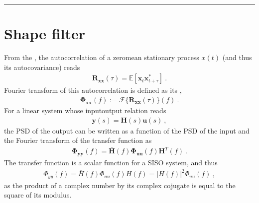 \documentclass[letterpaper,10pt,english]{jupyterBook}
\begin{document}
\bigskip\hrule\bigskip


\sphinxstepscope


\chapter{Shape filter}
\label{\detokenize{ch/system-theory/shape-filter:shape-filter}}\label{\detokenize{ch/system-theory/shape-filter:system-theory-shape-filter}}\label{\detokenize{ch/system-theory/shape-filter::doc}}
\sphinxAtStartPar
{}
From the {\hyperref[\detokenize{ch/system-theory/lti-response:ode-lti-response-stochastic}]{}}, the auto\sphinxhyphen{}correlation of a zero\sphinxhyphen{}mean stationary process \(x(t)\) (and thus its auto\sphinxhyphen{}covariance) reads
\begin{equation*}
\begin{split}\mathbf{R}_{\mathbf{x} \mathbf{x}}(\tau) = \mathbb{E}\left[ \mathbf{x}_t \mathbf{x}^*_{t + \tau} \right] \ .\end{split}
\end{equation*}
\sphinxAtStartPar
Fourier transform of this auto\sphinxhyphen{}correlation is defined as its ,
\begin{equation*}
\begin{split}\boldsymbol\Phi_{\mathbf{x} \mathbf{x}} (f) := \mathscr{F} \{ \mathbf{R}_{\mathbf{x} \mathbf{x}} (\tau) \} (f) \ .\end{split}
\end{equation*}
\sphinxAtStartPar
For a linear system whose input\sphinxhyphen{}output relation reads
\begin{equation*}
\begin{split}\mathbf{y}(s) = \mathbf{H}(s) \mathbf{u}(s) \ ,\end{split}
\end{equation*}
\sphinxAtStartPar
the PSD of the output can be written as a function of the PSD of the input and the Fourier transform of the transfer function as
\begin{equation}\label{equation:ch/system-theory/shape-filter:eq:psd:io:vector}
\begin{split}\boldsymbol\Phi_{\mathbf{y}\mathbf{y}} (f) = \overline{\mathbf{H}}(f) \boldsymbol\Phi_{\mathbf{u}\mathbf{u}}(f) \mathbf{H}^T(f) \ .\end{split}
\end{equation}
\sphinxAtStartPar
{} The transfer function is a scalar function for a SISO system, and thus
\begin{equation}\label{equation:ch/system-theory/shape-filter:eq:psd:io:scalar}
\begin{split}\Phi_{yy}(f) = \overline{H}(f) \Phi_{uu}(f) H(f) = \left| H(f) \right|^2 \Phi_{uu}(f) \ ,\end{split}
\end{equation}
\sphinxAtStartPar
as the product of a complex number by its complex cojugate is equal to the square of its modulus.
\end{document}
